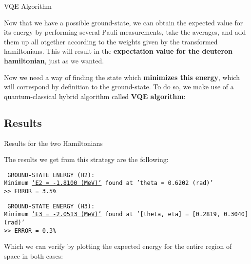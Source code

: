 \documentclass[9pt, handout, aspectratio=169]{beamer}		%
\begin{document}
	\begin{frame}{VQE Algorithm}

		Now that we have a possible ground-state, we can obtain the expected value for its energy by performing several Pauli measurements, take the averages, and add them up all otgether according to the weights given by the transformed hamiltonians. This will result in the \textbf{expectation value for the deuteron hamiltonian}, just as we wanted.

		\medskip

		Now we need a way of finding the state which \textbf{minimizes this energy}, which will correspond by definition to the ground-state. To do so, we make use of a quantum-classical hybrid algorithm called \textbf{VQE algorithm}:

	\end{frame}


	\subsection{Results}

	\begin{frame}{Results for the two Hamiltonians}

		The results we get from this strategy are the following:

		\bigskip

		\texttt{
			GROUND-STATE ENERGY (H2): \\
			Minimum \underline{'E2 = -1.8100 (MeV)'} found at 'theta = 0.6202 (rad)' \\
			>> ERROR = 3.5\% }

		\medskip

		\texttt{
			GROUND-STATE ENERGY (H3): \\
			Minimum \underline{'E3 = -2.0513 (MeV)'} found at '[theta, eta] = [0.2819, 0.3040] (rad)' \\
			>> ERROR = 0.3\% }

		\bigskip

		Which we can verify by plotting the expected energy for the entire region of space in both cases:

		\begin{multicols}{2}
			\columnbreak
		\end{multicols}

	\end{frame}

\end{document}

